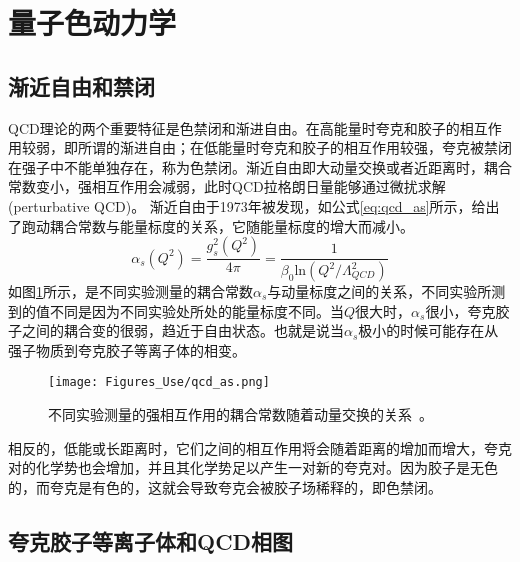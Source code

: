 \section{量子色动力学}  

\subsection{渐近自由和禁闭}  


QCD理论的两个重要特征是色禁闭和渐进自由。在高能量时夸克和胶子的相互作用较弱，即所谓的渐进自由；在低能量时夸克和胶子的相互作用较强，夸克被禁闭在强子中不能单独存在，称为色禁闭。渐近自由即大动量交换或者近距离时，耦合常数变小，强相互作用会减弱，此时QCD拉格朗日量能够通过微扰求解(perturbative QCD)。 渐近自由于1973年被发现\cite{politzer1973reliable,gross1973ultraviolet}，如公式\ref{eq:qcd_as}所示，给出了跑动耦合常数与能量标度的关系，它随能量标度的增大而减小。
\begin{equation}
\alpha_{s}(Q^{2}) = \frac{g_{s}^{2}(Q^{2})}{4\pi} = \frac{1}{\beta_{0}\mathrm{ln}(Q^2/\Lambda^2_{QCD})}
\label{eq:qcd_as}
\end{equation}
如图\ref{fig:qcd_as}所示，是不同实验测量的耦合常数$\alpha_{s}$与动量标度之间的关系，不同实验所测到的值不同是因为不同实验处所处的能量标度不同。当$Q$很大时，$\alpha_{s}$很小，夸克胶子之间的耦合变的很弱，趋近于自由状态。也就是说当$\alpha_{s}$极小的时候可能存在从强子物质到夸克胶子等离子体的相变。
\begin{figure}[htbp]
\centering
\texttt{[image: Figures\_Use/qcd\_as.png]}
\caption{不同实验测量的强相互作用的耦合常数随着动量交换的关系~\cite{Siegfried2016}。}
\label{fig:qcd_as}
\end{figure}

相反的，低能或长距离时，它们之间的相互作用将会随着距离的增加而增大，夸克对的化学势也会增加，并且其化学势足以产生一对新的夸克对。因为胶子是无色的，而夸克是有色的，这就会导致夸克会被胶子场稀释的，即色禁闭。


\subsection{夸克胶子等离子体和QCD相图}

